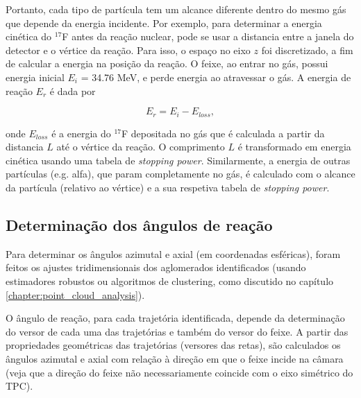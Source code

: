 \documentclass[a4paper,12pt,oneside]{book}
\begin{document}
\par Portanto, cada tipo de partícula tem um alcance diferente dentro do mesmo gás que depende da energia incidente. Por exemplo, para determinar a energia cinética do $^{17}$F antes da reação nuclear, pode se usar a distancia entre a janela do detector e o vértice da reação. Para isso, o espaço no eixo $z$ foi discretizado, a fim de calcular a energia na posição da reação. O feixe, ao entrar no gás, possui energia inicial $E_i$ = 34.76 MeV, e perde energia ao atravessar o gás. A energia de reação $E_r$ é dada por

\begin{equation}
	E_r = E_i - E_{loss},
\end{equation}

\par onde $E_{loss}$ é a energia do $^{17}$F depositada no gás que é calculada a partir da distancia $L$ até o vértice da reação. O comprimento $L$ é transformado em energia cinética usando uma tabela de \textit{stopping power}. Similarmente, a energia de outras partículas (e.g. alfa), que param completamente no gás, é calculado com o alcance da partícula (relativo ao vértice) e a sua respetiva tabela de \textit{stopping power}.


\subsection{Determinação dos ângulos de reação}

\par Para determinar os ângulos azimutal e axial (em coordenadas esféricas), foram feitos os ajustes tridimensionais dos aglomerados identificados (usando estimadores robustos ou algoritmos de clustering, como discutido no capítulo \ref{chapter:point_cloud_analysis}).

\par O ângulo de reação, para cada trajetória identificada, depende da determinação do versor de cada uma das trajetórias e também do versor do feixe. A partir das propriedades geométricas das trajetórias (versores das retas), são calculados os ângulos azimutal e axial com relação à direção em que o feixe incide na câmara (veja que a direção do feixe não necessariamente coincide com o eixo simétrico do TPC).
\end{document}
